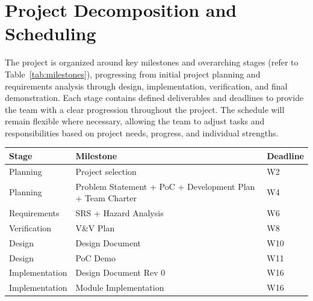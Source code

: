 \documentclass{article}
\begin{document}
\section{Project Decomposition and Scheduling}

The project is organized around key milestones and overarching stages 
(refer to Table~\ref{tab:milestones}), progressing from initial project planning and requirements
analysis through design, implementation, verification, and final demonstration. 
Each stage contains defined deliverables and deadlines to provide the team 
with a clear progression throughout the project. The schedule will remain 
flexible where necessary, allowing the team to adjust tasks and responsibilities 
based on project needs, progress, and individual strengths.

\begin{table}[ht]
    \centering
    
    \begin{tabularx}{\textwidth}{|>{\centering\arraybackslash}p{3cm}|
                                    X|
                                    >{\centering\arraybackslash}p{2cm}|}
        \hline
        \textbf{Stage} & \textbf{Milestone} & \textbf{Deadline} \\
        \hline
        
        Planning & Project selection & W2 \\
        \hline
        
        Planning & Problem Statement + PoC + Development Plan + Team Charter & W4 \\
        \hline
        
        Requirements & SRS + Hazard Analysis & W6 \\
        \hline
        
        Verification & V\&V Plan & W8 \\
        \hline
        
        Design & Design Document & W10 \\
        \hline
        
        Design & PoC Demo & W11 \\
        \hline
        
        Implementation & Design Document Rev 0 & W16 \\
        \hline
        
        Implementation & Module Implementation & W16 \\
        \hline
        

\end{tabularx}
\end{table}
\end{document}
